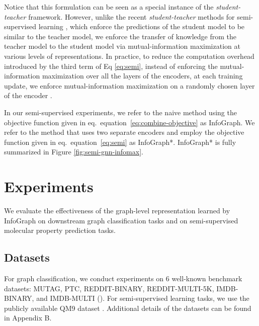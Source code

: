 \documentclass{article} \usepackage{iclr2020_conference,times}
\def\eqref#1{equation~\ref{#1}}
\def\method{InfoGraph}
\begin{document}
Notice that this formulation can be seen as a special instance of the \textit{student-teacher} framework. However, unlike the recent \textit{student-teacher} methods for semi-supervised learning \citep{laine2016temporal,tarvainen2017mean, ict}, which enforce the predictions of the student model to be similar to the teacher model, we enforce the transfer of knowledge from the teacher model to the student model via mutual-information maximization at various levels of representations. In practice, to reduce the computation overhead introduced by the third term of Eq \ref{eq:semi}, instead of enforcing the mutual-information maximization over all the layers of the encoders, at each training update, we enforce mutual-information maximization on a randomly chosen layer of the encoder \citep{manifold_mixup}.

In our semi-supervised experiments, we refer to the naive method using the objective function given in eq.~\eqref{eq:combine-objective} as \method{}. We refer to the method that uses two separate encoders and employ the objective function given in eq.~\eqref{eq:semi} as \method{}*. \method{}* is fully summarized in Figure \ref{fig:semi-gnn-infomax}.























 

\section{Experiments}
We evaluate the effectiveness of the graph-level representation learned by \method{} on downstream graph classification tasks and on semi-supervised molecular property prediction tasks.

\subsection{Datasets}
For graph classification, we conduct experiments on 6 well-known benchmark datasets: MUTAG, PTC, REDDIT-BINARY, REDDIT-MULTI-5K, IMDB-BINARY, and IMDB-MULTI (\cite{yanardag2015deep}).
For semi-supervised learning tasks, we use the publicly available QM9 dataset \cite{ramakrishnan2014quantum}. 
Additional details of the datasets can be found in Appendix B.
\end{document}
